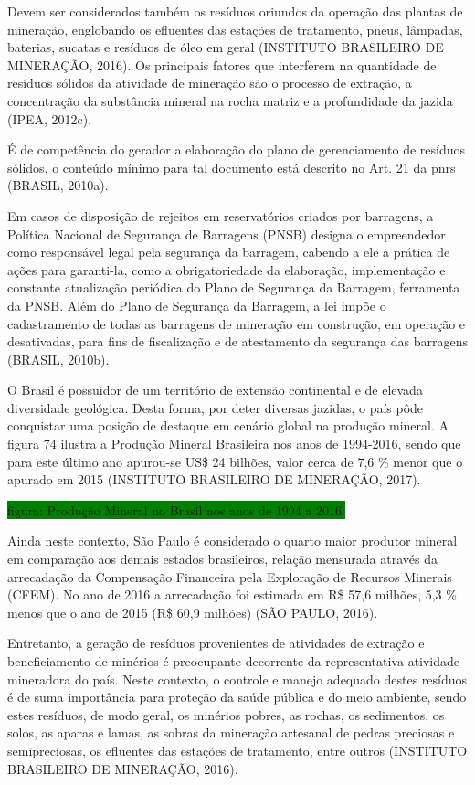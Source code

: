 	Devem ser considerados também os resíduos oriundos da operação das plantas de mineração, englobando os efluentes das estações de tratamento, pneus, lâmpadas, baterias, sucatas e resíduos de óleo em geral (INSTITUTO BRASILEIRO DE MINERAÇÃO, 2016). Os principais fatores que interferem na quantidade de resíduos sólidos da atividade de mineração são o processo de extração, a concentração da substância mineral na rocha matriz e a profundidade da jazida (IPEA, 2012c).
	
	É de competência do gerador a elaboração do plano de gerenciamento de resíduos sólidos, o conteúdo mínimo para tal documento está descrito no Art. 21 da \gls{pnrs} (BRASIL, 2010a).
	
	Em casos de disposição de rejeitos em reservatórios criados por barragens, a Política Nacional de Segurança de Barragens (PNSB) designa o empreendedor como responsável legal pela segurança da barragem, cabendo a ele a prática de ações para garanti-la, como a obrigatoriedade da elaboração, implementação e constante atualização periódica do Plano de Segurança da Barragem, ferramenta da PNSB. Além do Plano de Segurança da Barragem, a lei impõe o cadastramento de todas as barragens de mineração em construção, em operação e desativadas, para fins de fiscalização e de atestamento da segurança das barragens (BRASIL, 2010b).

	O Brasil é possuidor de um território de extensão continental e de elevada diversidade geológica. Desta forma, por deter diversas jazidas, o país pôde conquistar uma posição de destaque em cenário global na produção mineral. A figura 74 ilustra a Produção Mineral Brasileira nos anos de 1994-2016, sendo que para este último ano apurou-se US\$ 24 bilhões, valor cerca de 7,6 \% menor que o apurado em 2015 (INSTITUTO BRASILEIRO DE MINERAÇÃO, 2017).
	
	\colorbox{green}{figura: Produção Mineral no Brasil nos anos de 1994 a 2016.}
	
	Ainda neste contexto, São Paulo é considerado o quarto maior produtor mineral em comparação aos demais estados brasileiros, relação mensurada através da arrecadação da Compensação Financeira pela Exploração de Recursos Minerais (CFEM). No ano de 2016 a arrecadação foi estimada em R\$ 57,6 milhões, 5,3 \% menos que o ano de 2015 (R\$ 60,9 milhões) (SÃO PAULO, 2016).

	Entretanto, a geração de resíduos provenientes de atividades de extração e beneficiamento de minérios é preocupante decorrente da representativa atividade mineradora do país. Neste contexto, o controle e manejo adequado destes resíduos é de suma importância para proteção da saúde pública e do meio ambiente, sendo estes resíduos, de modo geral, os minérios pobres, as rochas, os sedimentos, os solos, as aparas e lamas, as sobras da mineração artesanal de pedras preciosas e semipreciosas, os efluentes das estações de tratamento, entre outros (INSTITUTO BRASILEIRO DE MINERAÇÃO, 2016). 
	
